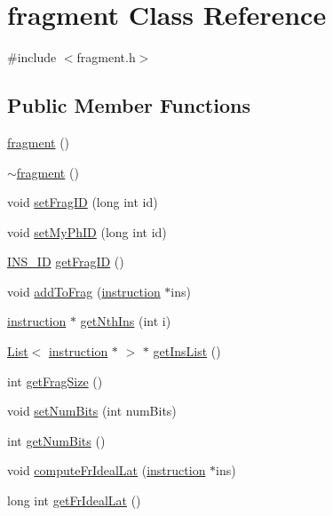 \hypertarget{classfragment}{
\section{fragment Class Reference}
\label{classfragment}
}


{\ttfamily \#include $<$fragment.h$>$}

\subsection*{Public Member Functions}
\begin{DoxyCompactItemize}
\item 
\hyperlink{classfragment_a4d2571d9d7d4a6c63a1104f80b93c459}{fragment} ()
\item 
\hyperlink{classfragment_a64e398a019d40e5876b1f6d949debb62}{$\sim$fragment} ()
\item 
void \hyperlink{classfragment_a576105bce7818f0ec6fc7cc32c36727a}{setFragID} (long int id)
\item 
void \hyperlink{classfragment_ac13cdd18e40da61acc3b7e36c4772c88}{setMyPhID} (long int id)
\item 
\hyperlink{global_2global_8h_a1883c47d0023d0f200e1d86eced6a070}{INS\_\-ID} \hyperlink{classfragment_a384635ae9d4415bb76246355bbd53e87}{getFragID} ()
\item 
void \hyperlink{classfragment_a536afae1860d52f35d230572958c5a48}{addToFrag} (\hyperlink{classinstruction}{instruction} $\ast$ins)
\item 
\hyperlink{classinstruction}{instruction} $\ast$ \hyperlink{classfragment_abad5ebb5003e717717832818787a0fce}{getNthIns} (int i)
\item 
\hyperlink{classList}{List}$<$ \hyperlink{classinstruction}{instruction} $\ast$ $>$ $\ast$ \hyperlink{classfragment_a9347b7f348f9d7844f8367eb6d331906}{getInsList} ()
\item 
int \hyperlink{classfragment_ad6928ee70f8db4c3081b1322103647cd}{getFragSize} ()
\item 
void \hyperlink{classfragment_abee934c501a60519bc610cd01208480f}{setNumBits} (int numBits)
\item 
int \hyperlink{classfragment_a33cff43f87509017ab6b5a5fbf954820}{getNumBits} ()
\item 
void \hyperlink{classfragment_a6082d6576975ec4166aedf50e3db8143}{computeFrIdealLat} (\hyperlink{classinstruction}{instruction} $\ast$ins)
\item 
long int \hyperlink{classfragment_a153c54dc61a825abfb1bc31c2361ad0f}{getFrIdealLat} ()

\end{DoxyCompactItemize}

